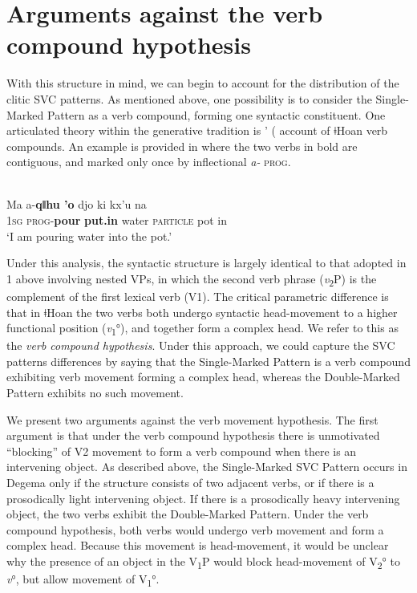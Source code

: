 \documentclass[output=paper]{langsci/langscibook}
\begin{document}
\section{Arguments against the verb compound hypothesis}
\label{bkm:Ref449523633}
With this structure in mind, we can begin to account for the distribution of the clitic SVC patterns. As mentioned above, one possibility is to consider the Single-Marked Pattern as a verb compound, forming one syntactic constituent. One articulated theory within the generative tradition is \citeauthor{Collins2002}’ (\citeyear*{collins2002} account of ǂHoan verb compounds. An example is provided in  where the two verbs in bold are contiguous, and marked only once by inflectional \textit{a-} \textsc{prog}.

\ea\label{ex:rolle:36}
\\
\gll  Ma  a-\textbf{qǁhu    {\textbar}’o}    djo    ki      kx’u    na\\
     \textsc{1sg}   \textsc{prog}{}-\textbf{pour}  \textbf{put.in}  water  \textsc{particle}  pot    in\\
\glt ‘I am pouring water into the pot.’ \citep[1]{Collins2002}
\z

Under this analysis, the syntactic structure is largely identical to that adopted in 1 above involving nested VPs, in which the second verb phrase (\textit{v}\textsubscript{2}P) is the complement of the first lexical verb (V1). The critical parametric difference is that in ǂHoan the two verbs both undergo syntactic head-movement to a higher functional position (\textit{v}\textsubscript{1}°), and together form a complex head. We refer to this as the \textit{verb compound hypothesis}. Under this approach, we could capture the SVC patterns differences by saying that the Single-Marked Pattern is a verb compound exhibiting verb movement forming a complex head, whereas the Double-Marked Pattern exhibits no such movement. 

We present two arguments against the verb movement hypothesis. The first argument is that under the verb compound hypothesis there is unmotivated “blocking” of V2 movement to form a verb compound when there is an intervening object. As described above, the Single-Marked SVC Pattern occurs in Degema only if the structure consists of two adjacent verbs, or if there is a prosodically light intervening object. If there is a prosodically heavy intervening object, the two verbs exhibit the Double-Marked Pattern. Under the verb compound hypothesis, both verbs would undergo verb movement and form a complex head. Because this movement is head-movement, it would be unclear why the presence of an object in the V\textsubscript{1}P would block head-movement of V\textsubscript{2}° to \textit{v}°, but allow movement of V\textsubscript{1}°.
\end{document}
